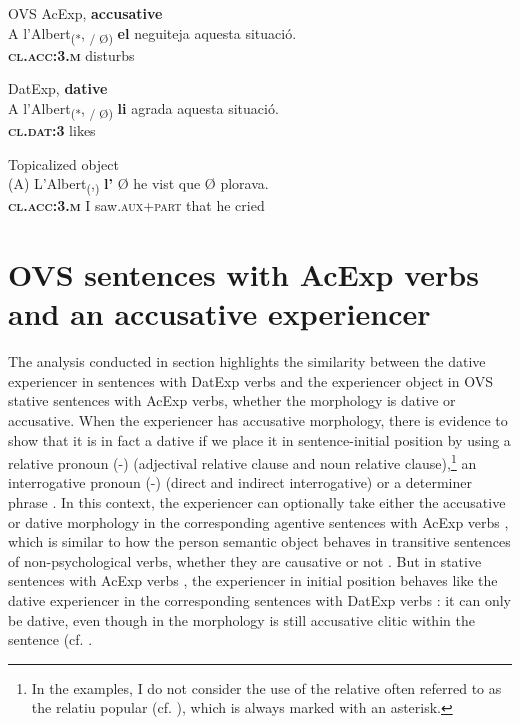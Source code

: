 \documentclass[output=paper,colorlinks,citecolor=brown,nonflat]{./langscibook}
\begin{document}
 \ex OVS AcExp, \textbf{accusative}\label{ex:royo:13b}\\
 \gll A l’Albert\textsubscript{(*}, \textsubscript{/ Ø)} \textbf{el} neguiteja aquesta situació.\\
  \textbf{\textsc{cl.acc:3.m}} disturbs \\
\glt {}
 
 \ex DatExp, \textbf{dative}\label{ex:royo:13c}\\
 \gll A l’Albert\textsubscript{(*}, \textsubscript{/ Ø)} \textbf{li} agrada aquesta situació.\\
  \textbf{\textsc{cl.dat:3}} likes \\
\glt {}
 
 \ex Topicalized object\label{ex:royo:13d}\\
 \gll (A) L’Albert\textsubscript{(},\textsubscript{)} \textbf{l’} Ø he vist que Ø plorava.\\
 \textbf{\textsc{cl.acc:3.m}} I saw.\textsc{aux+part} that he cried \\
\glt {}
 \z
 \z


\section{OVS sentences with AcExp verbs and an accusative experiencer}\label{sec:royo:4}

The analysis conducted in section  highlights the similarity between the dative experiencer in sentences with DatExp verbs and the experiencer object in OVS stative sentences with AcExp verbs, whether the morphology is dative or accusative. When the experiencer has accusative morphology, there is evidence to show that it is in fact a dative if we place it in sentence-initial position by using a relative pronoun (-) (adjectival relative clause and noun relative clause),\footnote{In the examples, I do not consider the use of the relative often referred to as the {relatiu} {popular} (cf. \citealt[154-155]{Ginebra2005}), which is always marked with an asterisk.} an interrogative pronoun (-) (direct and indirect interrogative) or a determiner phrase . In this context, the experiencer can optionally take either the accusative or dative morphology in the corresponding agentive sentences with AcExp verbs , which is similar to how the person semantic object behaves in transitive sentences of non-psychological verbs, whether they are causative or not . But in stative sentences with AcExp verbs , the experiencer in initial position behaves like the dative experiencer in the corresponding sentences with DatExp verbs : it can only be dative, even though in  the morphology is still accusative clitic within the sentence (cf. \citealt[Section 4.3.4]{Royo2017}.
\end{document}
